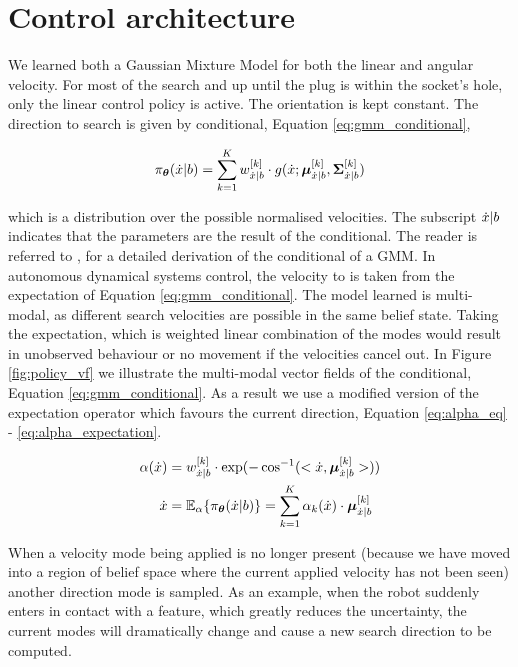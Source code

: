 \section{Control architecture}\label{ch4:control_architecture}

We learned both a Gaussian Mixture Model for both the linear and angular 
velocity. For most of the search and up until the plug is within the socket's hole, only 
the linear control policy is active. The orientation is kept constant.
The direction to search is given by conditional, Equation \ref{eq:gmm_conditional},

\begin{equation}\label{eq:gmm_conditional}
 \pi_{\boldsymbol{\theta}}(\dot{x}|b) = \sum_{k=1}^{K} w^{[k]}_{\dot{x}|b} \cdot g(\dot{x};\boldsymbol{\mu}^{[k]}_{\dot{x}|b},\boldsymbol{\Sigma}^{[k]}_{\dot{x}|b})
\end{equation}

which is a distribution over the possible normalised velocities. The subscript $\dot{x}|b$ indicates that the parameters 
are the result of the conditional. The reader is referred to \cite{gesture_calinon_2010},\cite{gmr_2004} for 
a detailed derivation of the conditional of a GMM. In autonomous
dynamical systems control, the velocity to is taken from 
the expectation of Equation \ref{eq:gmm_conditional}. The model 
learned is multi-modal, as different search velocities are possible 
in the same belief state. Taking the expectation, which is weighted 
linear combination of the modes would result in unobserved behaviour or 
no movement if the velocities cancel out. In Figure \ref{fig:policy_vf}
we illustrate the multi-modal vector fields of the conditional, Equation \ref{eq:gmm_conditional}.
As a result we use a modified version of the expectation operator which favours the current
direction, Equation \ref{eq:alpha_eq} - \ref{eq:alpha_expectation}.

\begin{align}
 \alpha(\dot{x}) &= w^{[k]}_{\dot{x}|b} \cdot \exp(-\cos^{-1}(<\dot{x},\boldsymbol{\mu}^{[k]}_{\dot{x}|b}>)) \label{eq:alpha_eq}\\
 \dot{x} &= \mathbb{E}_{\alpha}\{\pi_{\boldsymbol{\theta}}(\dot{x}|b)\} = \sum_{k=1}^K \alpha_k(\dot{x}) \cdot \boldsymbol{\mu}^{[k]}_{\dot{x}|b} \label{eq:alpha_expectation}
\end{align}

When a velocity mode being applied is no longer present (because we have moved into a region of belief space where the current applied 
velocity has not been seen) another direction mode is sampled. As an example, when the robot suddenly enters in contact with a feature,
which greatly reduces the uncertainty, the current modes will dramatically change and cause a new search direction to be computed. 

